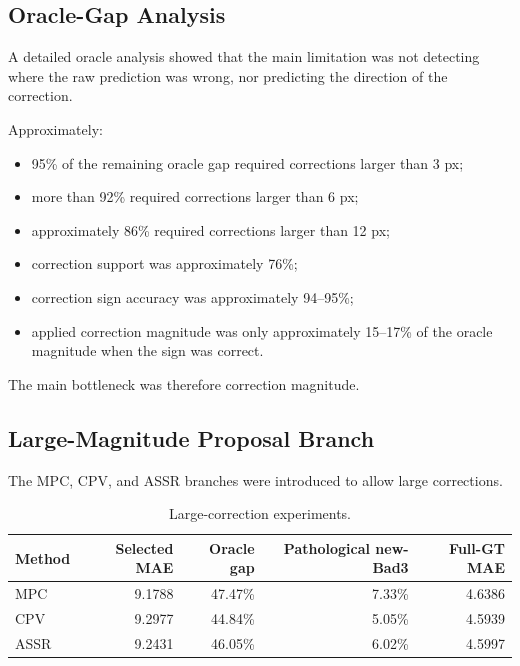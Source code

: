 \documentclass[11pt,a4paper]{article}
\begin{document}
\subsection{Oracle-Gap Analysis}

A detailed oracle analysis showed that the main limitation was not detecting where
the raw prediction was wrong, nor predicting the direction of the correction.

Approximately:

\begin{itemize}[leftmargin=*]
    \item 95\% of the remaining oracle gap required corrections larger than 3 px;
    \item more than 92\% required corrections larger than 6 px;
    \item approximately 86\% required corrections larger than 12 px;
    \item correction support was approximately 76\%;
    \item correction sign accuracy was approximately 94--95\%;
    \item applied correction magnitude was only approximately 15--17\% of the
    oracle magnitude when the sign was correct.
\end{itemize}

The main bottleneck was therefore correction magnitude.

\subsection{Large-Magnitude Proposal Branch}

The MPC, CPV, and ASSR branches were introduced to allow large corrections.

\begin{table}[h]
\centering
\caption{Large-correction experiments.}
\small
\begin{tabularx}{\textwidth}{
    >{\raggedright\arraybackslash}X
    r
    r
    r
    r
}
\toprule
\textbf{Method}
& \textbf{Selected MAE}
& \textbf{Oracle gap}
& \textbf{Pathological new-Bad3}
& \textbf{Full-GT MAE} \\
\midrule
MPC
& 9.1788
& 47.47\%
& 7.33\%
& 4.6386 \\

CPV
& 9.2977
& 44.84\%
& 5.05\%
& 4.5939 \\

ASSR
& 9.2431
& 46.05\%
& 6.02\%
& 4.5997 \\
\bottomrule
\end{tabularx}
\end{table}
\end{document}
